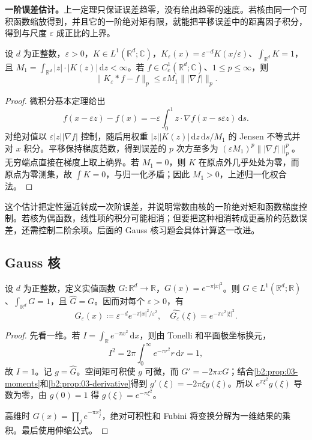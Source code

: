 \textbf{一阶误差估计。}上一定理只保证误差趋零，没有给出趋零的速度。若核由同一个可积函数缩放得到，并且它的一阶绝对矩有限，就能把平移误差中的距离因子积分，得到与尺度 \(\varepsilon\) 成正比的上界。

\begin{proposition}\label{b2:prop:03-first-moment-error}
设 \(d\) 为正整数，\(\varepsilon>0\)，\(K\in L^1(\mathbb R^d;\mathbb C)\)，\(K_\varepsilon(x)=\varepsilon^{-d}K(x/\varepsilon)\)、\(\int_{\mathbb R^d}K=1\)，且 \(M_1=\int_{\mathbb R^d}|z|\cdot|K(z)|\,\mathrm{d}z<\infty\)。若 \(f\in C_c^1(\mathbb R^d;\mathbb C)\)、\(1\leq p\leq\infty\)，则
\[
 \|K_\varepsilon*f-f\|_p
 \leq\varepsilon M_1\bigl\||\nabla f|\bigr\|_p.
\]
\end{proposition}
\begin{proof}
微积分基本定理给出
\[
 f(x-\varepsilon z)-f(x)
 =-\varepsilon\int_0^1 z\cdot\nabla f(x-s\varepsilon z)\,\mathrm{d}s.
\]
对绝对值以 \(\varepsilon|z||\nabla f|\) 控制，随后用权重 \(|z||K(z)|\,\mathrm{d}z\,\mathrm{d}s/M_1\) 的 Jensen 不等式并对 \(x\) 积分。平移保持梯度范数，得到误差的 \(p\) 次方至多为 \((\varepsilon M_1)^p\bigl\||\nabla f|\bigr\|_p^p\)。无穷端点直接在梯度上取上确界。若 \(M_1=0\)，则 \(K\) 在原点外几乎处处为零，而原点为零测集，故 \(\int K=0\)，与归一化矛盾；因此 \(M_1>0\)，上述归一化权合法。
\end{proof}

这个估计把定性逼近转成一次阶误差，并说明常数由核的一阶绝对矩和函数梯度控制。若核为偶函数，线性项的积分可能相消；但要把这种相消转成更高阶的范数误差，还需控制二阶余项。后面的 Gauss 核习题会具体计算这一改进。

\subsection{Gauss 核}
\label{b2:subsec:030403}

\begin{theorem}\label{b2:thm:03-gaussian}
设 \(d\) 为正整数，定义实值函数 \(G\colon\mathbb R^d\to\mathbb R\)，\(G(x)=e^{-\pi|x|^2}\)。则 \(G\in L^1(\mathbb R^d;\mathbb R)\)、\(\int_{\mathbb R^d}G=1\)，且 \(\widehat G=G\)。因而对每个 \(\varepsilon>0\)，有
\[
 G_\varepsilon(x)\coloneqq\varepsilon^{-d}e^{-\pi|x|^2/\varepsilon^2},
 \quad \widehat {G_\varepsilon}(\xi)=e^{-\pi\varepsilon^2|\xi|^2}.
\]
\end{theorem}
\begin{proof}
先看一维。若 \(I=\int_{\mathbb R}e^{-\pi x^2}\,\mathrm{d}x\)，则由 Tonelli 和平面极坐标换元，
\[
 I^2=2\pi\int_0^\infty e^{-\pi r^2}r\,\mathrm{d}r=1,
\]
故 \(I=1\)。记 \(g=\widehat G\)。空间矩可积使 \(g\) 可微，而 \(G'=-2\pi xG\)；结合\cref{b2:prop:03-moments}和\cref{b2:prop:03-derivative}得到 \(g'(\xi)=-2\pi\xi g(\xi)\)。所以 \(e^{\pi\xi^2}g(\xi)\) 导数为零，由 \(g(0)=1\) 得 \(g(\xi)=e^{-\pi\xi^2}\)。

高维时 \(G(x)=\prod_j e^{-\pi x_j^2}\)，绝对可积性和 Fubini 将变换分解为一维结果的乘积。最后使用伸缩公式。
\end{proof}


